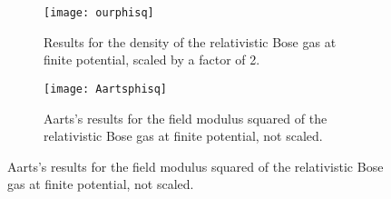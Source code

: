 \documentclass[../RotatingBosons.tex]{subfiles}
\begin{document}
\begin{figure}[h]
	\begin{subfigure}[b]{0.5\textwidth}
      \texttt{[image: ourphisq]}
        \caption{Results for the density of the relativistic Bose gas at finite potential, scaled by a factor of 2.}
        \label{fig:ourphisq}
    \end{subfigure}
    \begin{subfigure}[b]{0.5\textwidth}
        \texttt{[image: Aartsphisq]}
        \caption{Aarts's results for the field modulus squared of the relativistic Bose gas at finite potential, not scaled.}
        \label{fig:Aartsphisq}
    \end{subfigure}
\end{figure}

\end{document}
